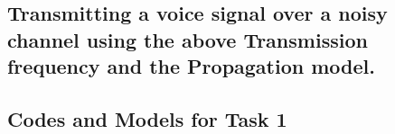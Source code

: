 \documentclass[a4paper,11pt]{article}%
\begin{document}
\subsection{Transmitting a voice signal over a noisy channel using the above Transmission frequency and the Propagation model.}






\pagebreak
\subsection{Codes and Models for Task 1}



%
%

\end{document}
